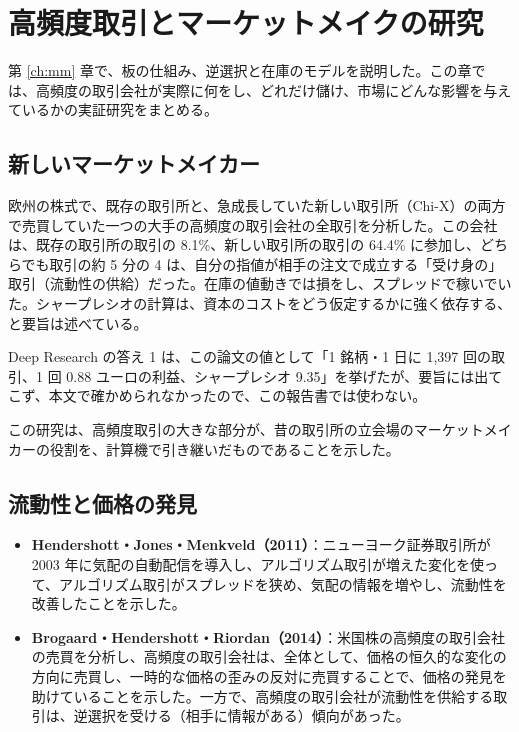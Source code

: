 \chapter{高頻度取引とマーケットメイクの研究}
\label{ch:hft}

第 \ref{ch:mm} 章で、板の仕組み、逆選択と在庫のモデルを説明した。この章では、高頻度の取引会社が実際に何をし、どれだけ儲け、市場にどんな影響を与えているかの実証研究をまとめる。

\section{新しいマーケットメイカー}

\begin{paperbox}
欧州の株式で、既存の取引所と、急成長していた新しい取引所（Chi-X）の両方で売買していた一つの大手の高頻度の取引会社の全取引を分析した。この会社は、既存の取引所の取引の 8.1\%、新しい取引所の取引の 64.4\% に参加し、どちらでも取引の約 5 分の 4 は、自分の指値が相手の注文で成立する「受け身の」取引（流動性の供給）だった。在庫の値動きでは損をし、スプレッドで稼いでいた。シャープレシオの計算は、資本のコストをどう仮定するかに強く依存する、と要旨は述べている。
\end{paperbox}

Deep Research の答え 1 は、この論文の値として「1 銘柄・1 日に 1,397 回の取引、1 回 0.88 ユーロの利益、シャープレシオ 9.35」を挙げたが、要旨には出てこず、本文で確かめられなかったので、この報告書では使わない。

この研究は、高頻度取引の大きな部分が、昔の取引所の立会場のマーケットメイカーの役割を、計算機で引き継いだものであることを示した。

\section{流動性と価格の発見}

\begin{itemize}
\item \textbf{Hendershott・Jones・Menkveld（2011）}\cite{hjm2011}：ニューヨーク証券取引所が 2003 年に気配の自動配信を導入し、アルゴリズム取引が増えた変化を使って、アルゴリズム取引がスプレッドを狭め、気配の情報を増やし、流動性を改善したことを示した。
\item \textbf{Brogaard・Hendershott・Riordan（2014）}\cite{bhr2014}：米国株の高頻度の取引会社の売買を分析し、高頻度の取引会社は、全体として、価格の恒久的な変化の方向に売買し、一時的な価格の歪みの反対に売買することで、価格の発見を助けていることを示した。一方で、高頻度の取引会社が流動性を供給する取引は、逆選択を受ける（相手に情報がある）傾向があった。
\end{itemize}


